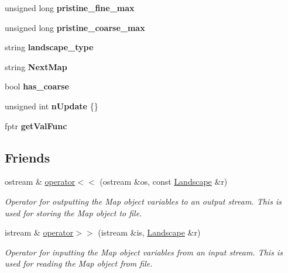 \begin{DoxyCompactItemize}
\item 
unsigned long {\bfseries pristine\+\_\+fine\+\_\+max}\hypertarget{class_landscape_a4353a23f1a363ef200b89a3100612cb5}{}\label{class_landscape_a4353a23f1a363ef200b89a3100612cb5}

\item 
unsigned long {\bfseries pristine\+\_\+coarse\+\_\+max}\hypertarget{class_landscape_ad7326e82982ff2397b3a7fc90f945d62}{}\label{class_landscape_ad7326e82982ff2397b3a7fc90f945d62}

\item 
string {\bfseries landscape\+\_\+type}\hypertarget{class_landscape_a2bed03fc250afab4f9341da6f1f6c0da}{}\label{class_landscape_a2bed03fc250afab4f9341da6f1f6c0da}

\item 
string {\bfseries Next\+Map}\hypertarget{class_landscape_a7e16bed309816971071c17ad0ebf94e5}{}\label{class_landscape_a7e16bed309816971071c17ad0ebf94e5}

\item 
bool {\bfseries has\+\_\+coarse}\hypertarget{class_landscape_a0389b53426acd490ec77f94d9897f130}{}\label{class_landscape_a0389b53426acd490ec77f94d9897f130}

\item 
unsigned int {\bfseries n\+Update} \{\}\hypertarget{class_landscape_ae4830197a96ec263ee533b65aac8d2e6}{}\label{class_landscape_ae4830197a96ec263ee533b65aac8d2e6}

\item 
fptr {\bfseries get\+Val\+Func}\hypertarget{class_landscape_a3cca2f0650d5979668f2a22753f965b9}{}\label{class_landscape_a3cca2f0650d5979668f2a22753f965b9}

\end{DoxyCompactItemize}
\subsection*{Friends}
\begin{DoxyCompactItemize}
\item 
ostream \& \hyperlink{class_landscape_a1c309185f0c3a601f27c932f1f2fa886}{operator$<$$<$} (ostream \&os, const \hyperlink{class_landscape}{Landscape} \&r)
\begin{DoxyCompactList}\small\item\em Operator for outputting the Map object variables to an output stream. This is used for storing the Map object to file. \end{DoxyCompactList}\item 
istream \& \hyperlink{class_landscape_a8b9beb241ad534346dc98d24f6bb9279}{operator$>$$>$} (istream \&is, \hyperlink{class_landscape}{Landscape} \&r)
\begin{DoxyCompactList}\small\item\em Operator for inputting the Map object variables from an input stream. This is used for reading the Map object from file. \end{DoxyCompactList}\end{DoxyCompactItemize}


